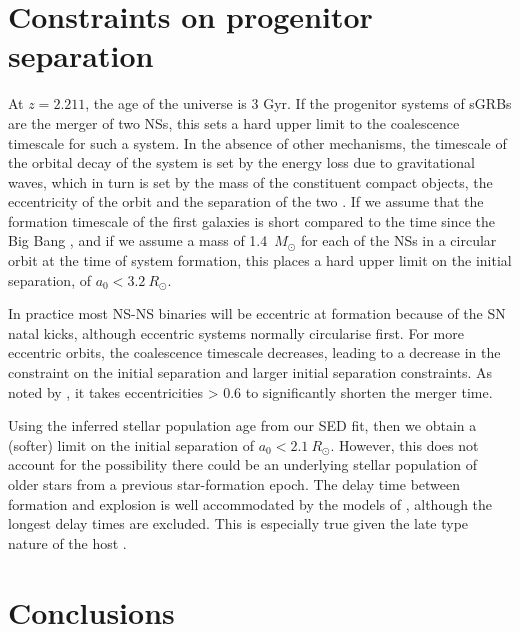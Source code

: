 \documentclass{aa}    %
\begin{document}
\section{Constraints on progenitor separation}

At $z = 2.211$, the age of the universe is 3 Gyr. If the progenitor systems of
sGRBs are the merger of two NSs, this sets a hard upper limit to the coalescence
timescale for such a system. In the absence of other mechanisms, the timescale
of the orbital decay of the system is set by the energy loss due to
gravitational waves, which in turn is set by the mass of the constituent compact
objects, the eccentricity of the orbit and the separation of the two \citep{Postnov2014}. If we assume that the
formation timescale of the first galaxies is short compared to the time since
the Big Bang \citep{Richard2011}, and if we assume a mass of 1.4~$M_\odot$ for
each of the NSs in a circular orbit at the time of system formation, this places
a hard upper limit on the initial separation, of $a_0 < 3.2~R_\odot$.

In practice most NS-NS binaries will be eccentric at formation because of the SN
natal kicks, although eccentric systems normally circularise first. For more
eccentric orbits, the coalescence timescale decreases, leading to a decrease in
the constraint on the initial separation and larger initial separation constraints. As
noted by \citet{Postnov2014}, it takes eccentricities > 0.6 to significantly
shorten the merger time. 

Using the inferred stellar population age from our SED fit, then we obtain a
(softer) limit on the initial separation of $a_0 < 2.1~R_\odot$. However, this
does not account for the possibility there could be an underlying stellar
population of older stars from a previous star-formation epoch. The delay time
between formation and explosion is well accommodated by the models of
\citet{Belczynski2006}, although the longest delay times are excluded.
This is especially true given the late type nature of the host
\citep{OShaughnessy2008}.

\section{Conclusions}
\end{document}
